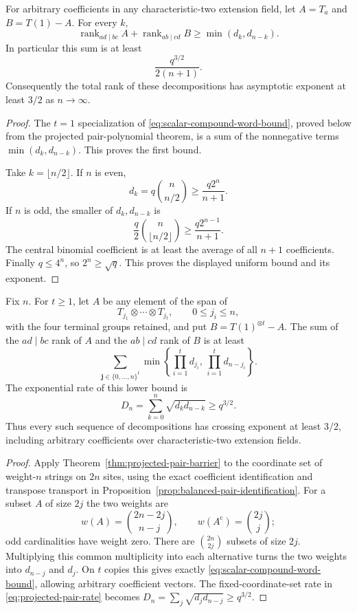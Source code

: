 \begin{theorem}
\label{thm:scalar-compound-barrier}
For arbitrary coefficients in any characteristic-two extension
field, let $A=T_a$ and $B=T(1)-A$. For every $k$,
\[
 \operatorname{rank}_{ad\mid bc}A+
 \operatorname{rank}_{ab\mid cd}B
 \geq\min(d_k,d_{n-k}).
\]
In particular this sum is at least
\[
 \frac{q^{3/2}}{2(n+1)}.
\]
Consequently the total rank of these decompositions has asymptotic
exponent at least $3/2$ as $n\to\infty$.
\end{theorem}
\begin{proof}
The $t=1$ specialization of
\eqref{eq:scalar-compound-word-bound}, proved below from the
projected pair-polynomial theorem, is a sum of the nonnegative
terms $\min(d_k,d_{n-k})$. This proves the first bound.

Take $k=\lfloor n/2\rfloor$. If $n$ is even,
\[
 d_k=q\binom{n}{n/2}\geq\frac{q2^n}{n+1}.
\]
If $n$ is odd, the smaller of $d_k,d_{n-k}$ is
\[
 \frac q2\binom{n}{\lfloor n/2\rfloor}
 \geq\frac{q2^{n-1}}{n+1}.
\]
The central binomial coefficient is at least the average of all
$n+1$ coefficients. Finally $q\leq4^n$, so $2^n\geq\sqrt q$.
This proves the displayed uniform bound and its exponent.
\end{proof}

\begin{theorem}
\label{thm:scalar-compound-tensor-barrier}
Fix $n$. For $t\geq1$, let $A$ be any element of the span of
\[
 T_{j_1}\otimes\cdots\otimes T_{j_t},\qquad 0\leq j_i\leq n,
\]
with the four terminal groups retained, and put $B=T(1)^{\otimes t}-A$.
The sum of the $ad\mid bc$ rank of $A$ and the $ab\mid cd$ rank of
$B$ is at least
\begin{equation}\label{eq:scalar-compound-word-bound}
 \sum_{\mathbf j\in\{0,\ldots,n\}^t}
 \min\left\{\prod_{i=1}^t d_{j_i},\,
                  \prod_{i=1}^t d_{n-j_i}\right\}.
\end{equation}
The exponential rate of this lower bound is
\[
 D_n=\sum_{k=0}^n\sqrt{d_kd_{n-k}}\geq q^{3/2}.
\]
Thus every such sequence of decompositions has crossing exponent
at least $3/2$, including arbitrary coefficients over
characteristic-two extension fields.
\end{theorem}
\begin{proof}
Apply Theorem~\ref{thm:projected-pair-barrier} to the coordinate set
of weight-$n$ strings on $2n$ sites, using the exact coefficient
identification and transpose transport in
Proposition~\ref{prop:balanced-pair-identification}.
For a subset $A$ of size $2j$ the two weights are
\[
 w(A)=\binom{2n-2j}{n-j},\qquad
 w(A^{\mathrm c})=\binom{2j}{j};
\]
odd cardinalities have weight zero. There are $\binom{2n}{2j}$
subsets of size $2j$. Multiplying this common multiplicity into
each alternative turns the two weights into $d_{n-j}$ and $d_j$.
On $t$ copies this gives exactly
\eqref{eq:scalar-compound-word-bound}, allowing arbitrary
coefficient vectors. The fixed-coordinate-set rate in
\eqref{eq:projected-pair-rate} becomes
$D_n=\sum_j\sqrt{d_jd_{n-j}}\geq q^{3/2}$.
\end{proof}

